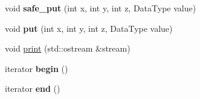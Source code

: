 \begin{DoxyCompactItemize}
\item 
\mbox{\label{classez_1_1objects_1_1Matrix3D_a01be5d7137b0e505f23b98b9ead84fc7}} 
void {\bfseries safe\+\_\+put} (int x, int y, int z, Data\+Type value)
\item 
\mbox{\label{classez_1_1objects_1_1Matrix3D_aac440ad88f5346e5d10f9f1ae53f4bf6}} 
void {\bfseries put} (int x, int y, int z, Data\+Type value)
\item 
void \hyperlink{classez_1_1objects_1_1Matrix3D_a5e68194ecbc90039bf694377a579b59c}{print} (std\+::ostream \&stream)
\item 
\mbox{\label{classez_1_1objects_1_1Matrix3D_a8f7565cbeff933a77c6a418a1ef33de7}} 
iterator {\bfseries begin} ()
\item 
\mbox{\label{classez_1_1objects_1_1Matrix3D_a4455fc86c241687009196f983994ddf5}} 
iterator {\bfseries end} ()
\end{DoxyCompactItemize}
